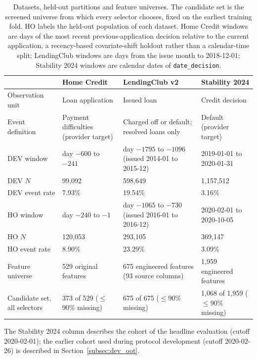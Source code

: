 \documentclass[final,5p,twocolumn]{elsarticle}
\begin{document}
\begin{table}[htbp]
\centering
\footnotesize
\begin{threeparttable}
\caption{Datasets, held-out partitions and feature universes. The candidate set is the screened universe from which every selector chooses, fixed on the earliest training fold. HO labels the held-out population of each dataset. Home Credit windows are days of the most recent previous-application decision relative to the current application, a recency-based covariate-shift holdout rather than a calendar-time split; LendingClub windows are days from the issue month to 2018-12-01; Stability 2024 windows are calendar dates of \texttt{date\_decision}.}
\label{tab:datasets}
\begin{tabular}{@{}lL{29mm}L{31mm}L{31mm}@{}}
\toprule
 & Home Credit & LendingClub v2 & Stability 2024 \\
\midrule
Observation unit & Loan application & Issued loan & Credit decision \\
Event definition & Payment difficulties (provider target) & Charged off or default; resolved loans only & Default (provider target) \\
DEV window & day $-600$ to $-241$ & day $-1795$ to $-1096$ (issued 2014-01 to 2015-12) & 2019-01-01 to 2020-01-31 \\
DEV $N$ & 99,092 & 598,649 & 1,157,512 \\
DEV event rate & 7.93\% & 19.54\% & 3.16\% \\
HO window & day $-240$ to $-1$ & day $-1065$ to $-730$ (issued 2016-01 to 2016-12) & 2020-02-01 to 2020-10-05 \\
HO $N$ & 120,053 & 293,105 & 369,147 \\
HO event rate & 8.90\% & 23.29\% & 3.09\% \\
Feature universe & 529 original features & 675 engineered features (93 source columns) & 1,959 engineered features \\
Candidate set, all selectors & 373 of 529 ($\le$90\% missing) & 675 of 675 ($\le$90\% missing) & 1,068 of 1,959 ($\le$90\% missing) \\
\bottomrule
\end{tabular}
\begin{tablenotes}\footnotesize
\item The Stability 2024 column describes the cohort of the headline evaluation (cutoff 2020-02-01); the earlier cohort used during protocol development (cutoff 2020-02-26) is described in Section~\ref{subsec:dev_oot}.
\end{tablenotes}
\end{threeparttable}
\end{table}
\end{document}
